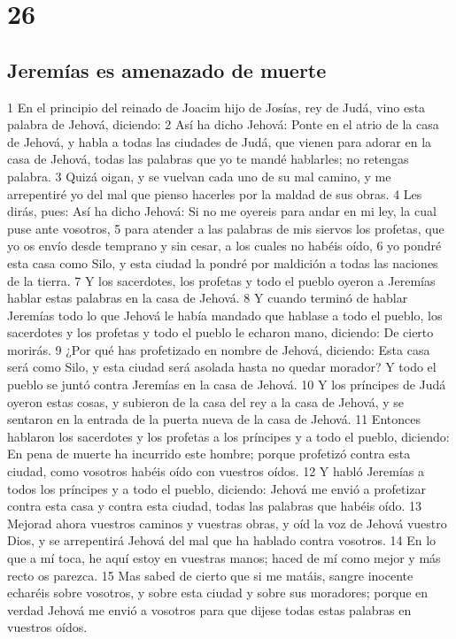 \chapter{26}

\section*{Jeremías es amenazado de muerte}

1 En el principio del reinado de Joacim hijo de Josías, rey de Judá, vino esta palabra de Jehová, diciendo:
2 Así ha dicho Jehová: Ponte en el atrio de la casa de Jehová, y habla a todas las ciudades de Judá, que vienen para adorar en la casa de Jehová, todas las palabras que yo te mandé hablarles; no retengas palabra.
3 Quizá oigan, y se vuelvan cada uno de su mal camino, y me arrepentiré yo del mal que pienso hacerles por la maldad de sus obras.
4 Les dirás, pues: Así ha dicho Jehová: Si no me oyereis para andar en mi ley, la cual puse ante vosotros,
5 para atender a las palabras de mis siervos los profetas, que yo os envío desde temprano y sin cesar, a los cuales no habéis oído,
6 yo pondré esta casa como Silo, y esta ciudad la pondré por maldición a todas las naciones de la tierra.
7 Y los sacerdotes, los profetas y todo el pueblo oyeron a Jeremías hablar estas palabras en la casa de Jehová.
8 Y cuando terminó de hablar Jeremías todo lo que Jehová le había mandado que hablase a todo el pueblo, los sacerdotes y los profetas y todo el pueblo le echaron mano, diciendo: De cierto morirás.
9 ¿Por qué has profetizado en nombre de Jehová, diciendo: Esta casa será como Silo, y esta ciudad será asolada hasta no quedar morador? Y todo el pueblo se juntó contra Jeremías en la casa de Jehová.
10 Y los príncipes de Judá oyeron estas cosas, y subieron de la casa del rey a la casa de Jehová, y se sentaron en la entrada de la puerta nueva de la casa de Jehová.
11 Entonces hablaron los sacerdotes y los profetas a los príncipes y a todo el pueblo, diciendo: En pena de muerte ha incurrido este hombre; porque profetizó contra esta ciudad, como vosotros habéis oído con vuestros oídos.
12 Y habló Jeremías a todos los príncipes y a todo el pueblo, diciendo: Jehová me envió a profetizar contra esta casa y contra esta ciudad, todas las palabras que habéis oído.
13 Mejorad ahora vuestros caminos y vuestras obras, y oíd la voz de Jehová vuestro Dios, y se arrepentirá Jehová del mal que ha hablado contra vosotros.
14 En lo que a mí toca, he aquí estoy en vuestras manos; haced de mí como mejor y más recto os parezca.
15 Mas sabed de cierto que si me matáis, sangre inocente echaréis sobre vosotros, y sobre esta ciudad y sobre sus moradores; porque en verdad Jehová me envió a vosotros para que dijese todas estas palabras en vuestros oídos.
